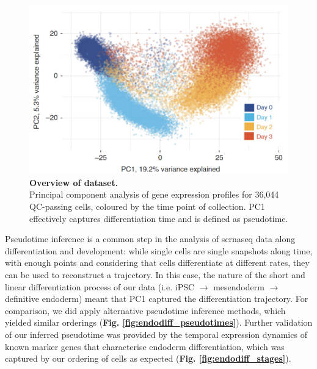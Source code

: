 \begin{figure}[h]
\centering
\includegraphics[width=14cm]{Chapter4/Fig/endodiff_pca_overview.png}
\caption[Overview of dataset.]{\textbf{Overview of dataset.}\\
Principal component analysis of gene expression profiles for 36,044 QC-passing
cells, coloured by the time point of collection.
PC1 effectively captures differentiation time and is defined as pseudotime.}
\label{fig:endodiff_pca}
\end{figure}

Pseudotime inference is a common step in the analysis of \gls{scrnaseq} data along differentiation and development: while single cells are single snapshots along time, with enough points and considering that cells differentiate at different rates, they can be used to reconstruct a trajectory.
In this case, the nature of the short and linear differentiation process of our data (i.e. iPSC $\rightarrow$ mesendoderm $\rightarrow$ definitive endoderm) meant that PC1 captured the differentiation trajectory.
For comparison, we did apply alternative pseudotime inference methods, which yielded similar orderings (\textbf{Fig. \ref{fig:endodiff_pseudotimes}}).
Further validation of our inferred pseudotime was provided by the temporal expression dynamics of known marker genes that characterise endoderm differentiation, which was captured by our ordering of cells as expected (\textbf{Fig. \ref{fig:endodiff_stages}}).

